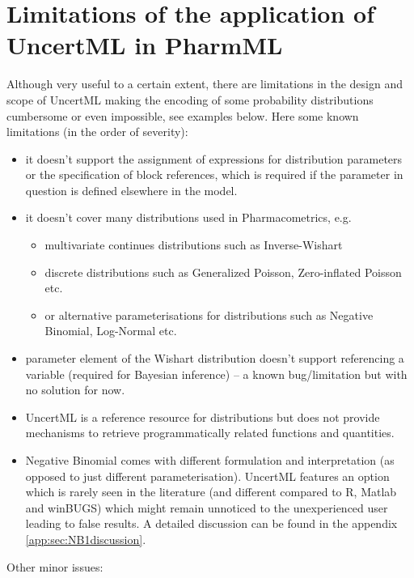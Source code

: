 \section{Limitations of the application of UncertML in PharmML}
\label{sec:uncertmlLimits}
Although very useful to a certain extent, there are limitations in
the design and scope of UncertML making the encoding of some 
probability distributions cumbersome or even impossible, see examples below. 
Here some known limitations (in the order of severity):
\begin{itemize}
\item
it doesn't support the assignment of expressions for distribution parameters or 
the specification of block references, which is required if the parameter in question 
is defined elsewhere in the model. 
\item
it doesn't cover many distributions used in Pharmacometrics, e.g. 
\begin{itemize}
\item 
multivariate continues distributions such as Inverse-Wishart
\item
discrete distributions such as Generalized Poisson, Zero-inflated Poisson etc.
\item
or alternative parameterisations for distributions such as Negative Binomial, 
Log-Normal etc.
\end{itemize}
\item
{} parameter element of the Wishart distribution doesn't support
referencing a variable (required for Bayesian inference) -- a known bug/limitation 
but with no solution for now.
\item
UncertML is a reference resource for distributions but does not provide 
mechanisms to retrieve programmatically related functions and
quantities.  
\item
Negative Binomial comes with different formulation and interpretation 
(as opposed to just different parameterisation). UncertML features an option which is 
rarely seen in the literature (and different compared to R, Matlab and winBUGS) 
which might remain unnoticed to the unexperienced user leading to false results.
A detailed discussion can be found in the appendix \ref{app:sec:NB1discussion}.
\end{itemize}
Other minor issues:
